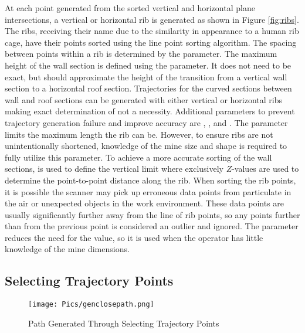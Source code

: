 At each point generated from the sorted vertical and horizontal plane intersections, a vertical or horizontal rib is generated as shown in Figure \ref{fig:ribs}. The ribs, receiving their name due to the similarity in appearance to a human rib cage, have their points sorted using the line point sorting algorithm. The spacing between points within a rib is determined by the  parameter. The maximum height of the wall section is defined using the  parameter. It does not need to be exact, but should approximate the height of the transition from a vertical wall section to a horizontal roof section. Trajectories for the curved sections between wall and roof sections can be generated with either vertical or horizontal ribs making exact determination of  not a necessity. Additional parameters to prevent trajectory generation failure and improve accuracy are , , and . The parameter  limits the maximum length the rib can be. However, to ensure ribs are not unintentionally shortened, knowledge of the mine size and shape is required to fully utilize this parameter. To achieve a more accurate sorting of the wall sections,  is used to define the vertical limit where exclusively $Z$-values are used to determine the point-to-point distance along the rib. When sorting the rib points, it is possible the scanner may pick up erroneous data points from particulate in the air or unexpected objects in the work environment. These data points are usually significantly further away from the line of rib points, so any points further than  from the previous point is considered an outlier and ignored. The  parameter reduces the need for the  value, so it is used when the operator has little knowledge of the mine dimensions.\\

\subsection{Selecting Trajectory Points}
\begin{figure}[H]
    \centering
    \texttt{[image: Pics/genclosepath.png]}
    \caption{Path Generated Through Selecting Trajectory Points}
    \label{fig:path}
\end{figure}

